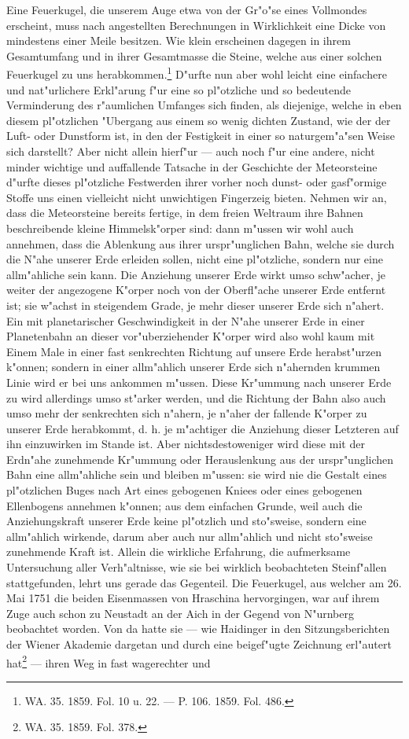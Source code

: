 \documentclass[a4paper, 8pt, oneside, polutonikogreek, german]{article}
\begin{document}
Eine Feuerkugel, die unserem Auge etwa von der Gr"o"se eines Vollmondes erscheint, muss nach angestellten Berechnungen in Wirklichkeit eine Dicke von mindestens einer Meile besitzen. Wie klein erscheinen dagegen in ihrem Gesamtumfang und in ihrer Gesamtmasse die Steine, welche aus einer solchen Feuerkugel zu uns herabkommen.\footnote{WA. 35. 1859. Fol. 10 u. 22. --- P. 106. 1859. Fol. 486.} D"urfte nun aber wohl leicht eine einfachere und nat"urlichere Erkl"arung f"ur eine so pl"otzliche und so bedeutende Verminderung des r"aumlichen Umfanges sich finden, als diejenige, welche in eben diesem pl"otzlichen "Ubergang aus einem so wenig dichten Zustand, wie der der Luft- oder Dunstform ist, in den der Festigkeit in einer so naturgem"a"sen Weise sich darstellt? Aber nicht allein hierf"ur --- auch noch f"ur eine andere, nicht minder wichtige und auffallende Tatsache in der Geschichte der Meteorsteine d"urfte dieses pl"otzliche Festwerden ihrer vorher noch dunst- oder gasf"ormige Stoffe uns einen vielleicht nicht unwichtigen Fingerzeig bieten. Nehmen wir an, dass die Meteorsteine bereits fertige, in dem freien Weltraum ihre Bahnen beschreibende kleine Himmelsk"orper sind: dann m"ussen wir wohl auch annehmen, dass die Ablenkung aus ihrer urspr"unglichen Bahn, welche sie durch die N"ahe unserer Erde erleiden sollen, nicht eine pl"otzliche, sondern nur eine allm"ahliche sein kann. Die Anziehung unserer Erde wirkt umso schw"acher, je weiter der angezogene K"orper noch von der Oberfl"ache unserer Erde entfernt ist; sie w"achst in steigendem Grade, je mehr dieser unserer Erde sich n"ahert. Ein mit planetarischer Geschwindigkeit in der N"ahe unserer Erde in einer Planetenbahn an dieser vor"uberziehender K"orper wird also wohl kaum mit Einem Male in einer fast senkrechten Richtung auf unsere Erde herabst"urzen k"onnen; sondern in einer allm"ahlich unserer Erde sich n"ahernden krummen Linie wird er bei uns ankommen m"ussen. Diese Kr"ummung nach unserer Erde zu wird allerdings umso st"arker werden, und die Richtung der Bahn also auch umso mehr der senkrechten sich n"ahern, je n"aher der fallende K"orper zu unserer Erde herabkommt, d. h. je m"achtiger die Anziehung dieser Letzteren auf ihn einzuwirken im Stande ist. Aber nichtsdestoweniger wird diese mit der Erdn"ahe zunehmende Kr"ummung oder Herauslenkung aus der urspr"unglichen Bahn eine allm"ahliche sein und bleiben m"ussen: sie wird nie die Gestalt eines pl"otzlichen Buges nach Art eines gebogenen Kniees oder eines gebogenen Ellenbogens annehmen k"onnen; aus dem einfachen Grunde, weil auch die Anziehungskraft unserer Erde keine pl"otzlich und sto"sweise, sondern eine allm"ahlich wirkende, darum aber auch nur allm"ahlich und nicht sto"sweise zunehmende Kraft ist. Allein die wirkliche Erfahrung, die aufmerksame Untersuchung aller Verh"altnisse, wie sie bei wirklich beobachteten Steinf"allen stattgefunden, lehrt uns gerade das Gegenteil. Die Feuerkugel, aus welcher am 26. Mai 1751 die beiden Eisenmassen von Hraschina hervorgingen, war auf ihrem Zuge auch schon zu Neustadt an der Aich in der Gegend von N"urnberg beobachtet worden. Von da hatte sie --- wie Haidinger in den Sitzungsberichten der Wiener Akademie dargetan und durch eine beigef"ugte Zeichnung erl"autert hat\footnote{WA. 35. 1859. Fol. 378.} --- ihren Weg in fast wagerechter und 
\end{document}
